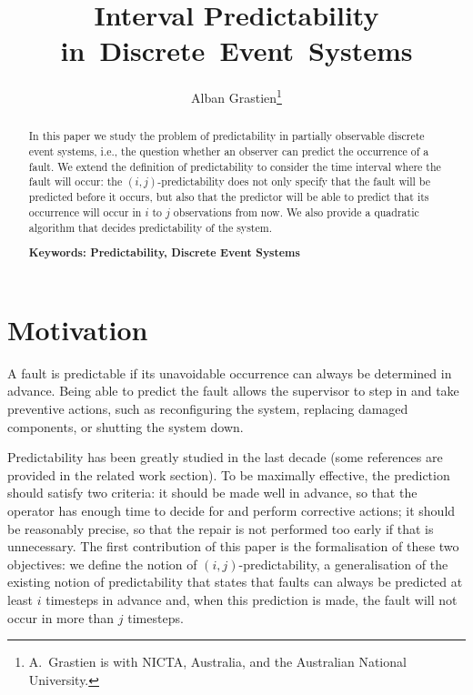 \documentclass{article}
\begin{document}
\title{Interval Predictability \mbox{in Discrete Event Systems}}
\author{Alban Grastien\thanks{A.~Grastien is with NICTA, Australia, 
and the Australian National University.}
}

\maketitle

\begin{abstract}
  In this paper we study the problem of predictability 
  in partially observable discrete event systems, 
  i.e., the question whether an observer 
  can predict the occurrence of a fault.  
  We extend the definition of predictability 
  to consider the time interval where the fault will occur: 
  the $(i,j)$-predictability does not only specify 
  that the fault will be predicted before it occurs, 
  but also that the predictor will be able 
  to predict that its occurrence will occur 
  in $i$ to $j$ observations from now.  
  We also provide a quadratic algorithm 
  that decides predictability of the system.  

  {\bf Keywords: Predictability, Discrete Event Systems}
\end{abstract}

\section{Motivation}
A fault is predictable 
if its unavoidable occurrence can always be determined in advance.  
Being able to predict the fault 
allows the supervisor to step in 
and take preventive actions, 
such as reconfiguring the system, 
replacing damaged components, or shutting the system down.  

Predictability has been greatly studied in the last decade 
(some references are provided in the related work section).  
To be maximally effective, 
the prediction should satisfy two criteria: 
it should be made well in advance, 
so that the operator has enough time 
to decide for and perform corrective actions; 
it should be reasonably precise, 
so that the repair is not performed too early 
if that is unnecessary.  
The first contribution of this paper is the formalisation 
of these two objectives: 
we define the notion of $(i,j)$-predictability, 
a generalisation of the existing notion of predictability 
that states that faults can always be predicted 
at least $i$ timesteps in advance 
and, when this prediction is made, 
the fault will not occur in more than $j$ timesteps.  
\end{document}
